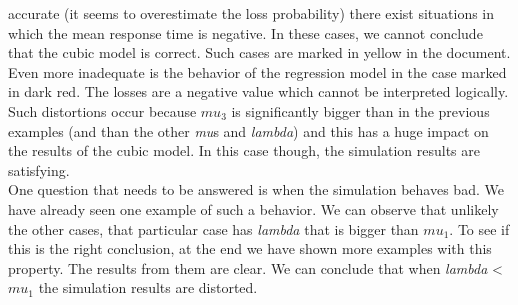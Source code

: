 \documentclass[12pt]{article}
\theoremstyle{plain}
\begin{document}
accurate (it seems to overestimate the loss probability) there exist situations
in which the mean response time is negative. In these cases, we cannot conclude
that the cubic model is correct. Such cases are marked in yellow in the document.
Even more inadequate is the behavior of the regression model in the case marked
in dark red. The losses are a negative value which cannot be interpreted logically.
Such distortions occur because $mu_3$ is significantly bigger than in the previous
examples (and than the other \emph{mu}s and \emph{lambda}) and this has a huge
impact on the results of the cubic model. In this case though, the simulation
results are satisfying.\\
One question that needs to be answered is when the simulation behaves bad. We
have already seen one example of such a behavior. We can observe that unlikely
the other cases, that particular case has \emph{lambda} that is bigger than
$mu_1$. To see if this is the right conclusion, at the end we have shown more
examples with this property. The results from them are clear. We can conclude
that when \emph{lambda} < $mu_1$ the simulation results are distorted.
\end{document}
